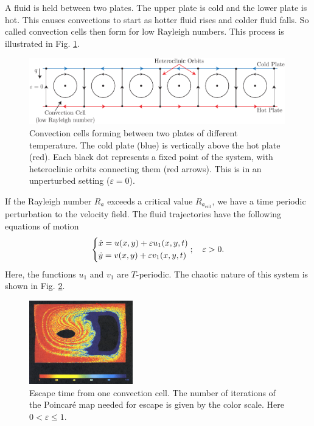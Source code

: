 \begin{ex}
	A fluid is held between two plates. The upper plate is cold and the lower plate is hot. This causes convections to start as hotter fluid rises and colder fluid falls. So called convection cells then form for low Rayleigh numbers. This process is illustrated in Fig. \ref{fig:convection_cells}.
	\begin{figure}[h!]
		\centering
		\includegraphics[width=0.99\textwidth]{figures/ch6/4convection_plates.pdf}
		\caption{Convection cells forming between two plates of different temperature. The cold plate (blue) is vertically above the hot plate (red). Each black dot represents a fixed point of the system, with heteroclinic orbits connecting them (red arrows). This is in an unperturbed setting ($\varepsilon =0 $).}
		\label{fig:convection_cells}
	\end{figure}

	If the Rayleigh number $R_{a}$ exceeds a critical value $R_{a_{ \textrm{crit} }}$, we have a time periodic perturbation to the velocity field. The fluid trajectories have the following equations of motion
	\begin{align}
		\begin{dcases}
			\dot{x} = u(x,y) + \varepsilon u_1(x,y,t) \\
			\dot{y} = v(x,y) + \varepsilon v_1 (x,y,t)
		\end{dcases}
;\quad \varepsilon>0.		
	\end{align}
	Here, the functions $u_1$ and $v_1$ are $T$-periodic. The chaotic nature of this system is shown in Fig. \ref{fig:convection_chaos}.
	\begin{figure}[h!]
		\centering
		\includegraphics[width=0.4\textwidth]{figures/ch6/5convection_chaos.png}
		\caption{Escape time from one convection cell. The number of iterations of the Poincaré map needed for escape is given by the color scale. Here $0 < \varepsilon \leq 1$.}
		\label{fig:convection_chaos}
	\end{figure}
	
\end{ex}

